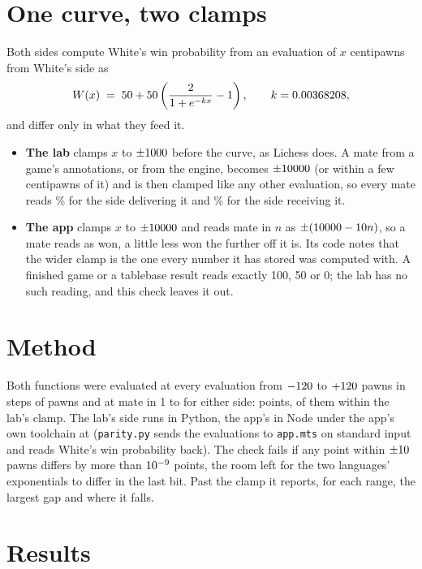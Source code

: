 \documentclass[11pt]{article}
\begin{document}
\section{One curve, two clamps}

Both sides compute White's win probability from an evaluation of $x$ centipawns from White's
side as
\[
  W(x) \;=\; 50 + 50\left(\frac{2}{1+e^{-kx}} - 1\right),\qquad k = 0.00368208,
\]
and differ only in what they feed it.

\begin{itemize}[nosep]
\item \textbf{The lab} clamps $x$ to $\pm1000$ before the curve, as Lichess does. A mate
from a game's annotations, or from the engine, becomes $\pm10000$ (or within a few
centipawns of it) and is then clamped like any other evaluation, so every mate reads
\LabCeiling\% for the side delivering it and \LabFloor\% for the side receiving it.
\item \textbf{The app} clamps $x$ to $\pm10000$ and reads mate in $n$ as $\pm(10000 - 10 n)$,
so a mate reads as won, a little less won the further off it is. Its code notes that the wider clamp
is the one every number it has stored was computed with. A finished game or a tablebase result
reads exactly 100, 50 or 0; the lab has no such reading, and this check leaves it out.
\end{itemize}

\section{Method}

Both functions were evaluated at every evaluation from $-120$ to $+120$ pawns
in steps of \GridStepPawns{} pawns and at mate in 1 to \MateMax{} for either side: \AllPoints{} points, \SharedPoints{} of
them within the lab's clamp. The lab's side runs in Python, the app's in Node under the app's
own toolchain at \AppCommit{} (\texttt{parity.py} sends the evaluations to \texttt{app.mts} on
standard input and reads White's win probability back). The check fails if any point within
$\pm10$ pawns differs by more than $10^{-9}$ points, the room left for the two
languages' exponentials to differ in the last bit. Past the clamp it reports, for each range,
the largest gap and where it falls.

\section{Results}
\end{document}

